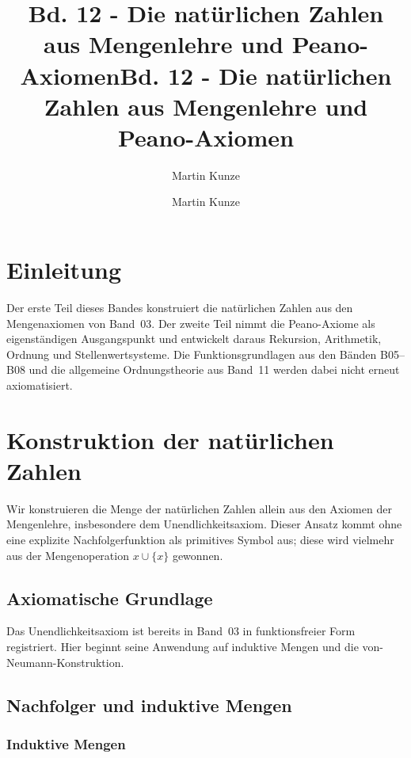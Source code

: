 \documentclass[main.tex]{subfiles}
\title{Bd. 12 - Die natürlichen Zahlen aus Mengenlehre und Peano-Axiomen}
\author{Martin Kunze}
\date{}
\begin{document}
\title{Bd. 12 - Die natürlichen Zahlen aus Mengenlehre und Peano-Axiomen}
\author{Martin Kunze}
\date{}
\hypersetup{pageanchor=false}
\maketitle
\hypersetup{pageanchor=true}
\setcounter{tocdepth}{3}
\tableofcontents
\setcounter{file}{12}
\renewcommand{\FormulaBandID}{12}

\chapter{Einleitung}

Der erste Teil dieses Bandes konstruiert die natürlichen Zahlen aus den
Mengenaxiomen von Band~03. Der zweite Teil nimmt die Peano-Axiome als
eigenständigen Ausgangspunkt und entwickelt daraus Rekursion, Arithmetik,
Ordnung und Stellenwertsysteme. Die Funktionsgrundlagen aus den Bänden
B05--B08 und die allgemeine Ordnungstheorie aus Band~11 werden dabei nicht
erneut axiomatisiert.

\chapter{Konstruktion der natürlichen Zahlen}

Wir konstruieren die Menge der natürlichen Zahlen allein aus den Axiomen der Mengenlehre, insbesondere dem Unendlichkeitsaxiom.  Dieser Ansatz kommt ohne eine explizite Nachfolgerfunktion als primitives Symbol aus; diese wird vielmehr aus der Mengenoperation \(x \cup \{x\}\) gewonnen.


\section{Axiomatische Grundlage}

Das Unendlichkeitsaxiom ist bereits in Band~03 in funktionsfreier Form
registriert. Hier beginnt seine Anwendung auf induktive Mengen und die
von-Neumann-Konstruktion.

\section{Nachfolger und induktive Mengen}

\subsection{Induktive Mengen}
\end{document}
